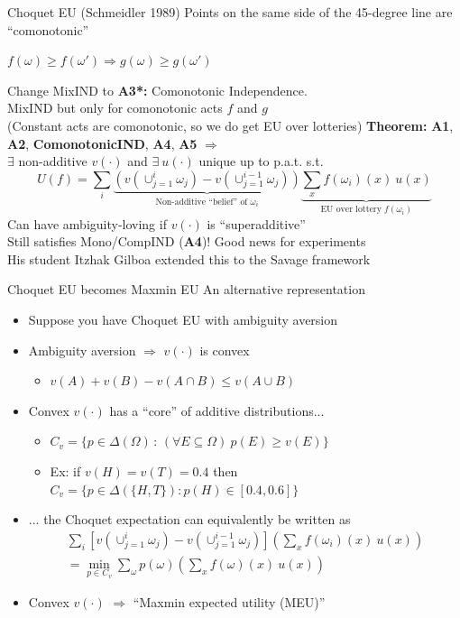 \begin{frame}{Choquet EU (Schmeidler 1989)}
    Points on the same side of the 45-degree line are ``comonotonic''
    \begin{center}
        $f(\omega)\geq f(\omega') \Rightarrow g(\omega)\geq g(\omega')$
    \end{center}
    Change MixIND to \textbf{A3*:} Comonotonic Independence.\\
    MixIND but only for comonotonic acts $f$ and $g$\\
    (Constant acts are comonotonic, so we do get EU over lotteries)
    \br
    \textbf{Theorem:} \textbf{A1}, \textbf{A2}, \textbf{ComonotonicIND}, \textbf{A4}, \textbf{A5} $\Rightarrow$\\
    $\exists$ non-additive $v(\cdot)$ and $\exists\ u(\cdot)$ unique up to p.a.t. s.t.
    $$
        U(f) = \sum_i \underbrace{\left( v(\cup_{j=1}^i \omega_j) - v(\cup_{j=1}^{i-1} \omega_j) \right)}_{\text{Non-additive ``belief'' of }\omega_i} \underbrace{\sum_x f(\omega_i)(x)\ u(x)}_{\text{EU over lottery }f(\omega_i)} 
    $$
    Can have ambiguity-loving if $v(\cdot)$ is ``superadditive''\\
    Still satisfies Mono/CompIND (\textbf{A4})! Good news for experiments\\
    His student Itzhak Gilboa extended this to the Savage framework
\end{frame}

\begin{frame}{Choquet EU becomes Maxmin EU}
An alternative representation
\begin{itemize}
    \item Suppose you have Choquet EU with ambiguity aversion
    \item Ambiguity aversion $\Rightarrow$ $v(\cdot)$ is convex
    \begin{itemize}
        \item $v(A)+v(B) - v(A\cap B) \leq v(A\cup B)$
    \end{itemize}
    \item Convex $v(\cdot)$ has a ``core'' of additive distributions...
    \begin{itemize}
        \item $C_v = \{p\in \Delta(\Omega)\, :\, (\forall E\subseteq \Omega)\ p(E)\geq v(E)\}$
        \item Ex: if $v(H)=v(T)=0.4$ then $C_v=\{p\in \Delta(\{H,T\}): p(H)\in [0.4,0.6]\}$
    \end{itemize}
    \item ... the Choquet expectation can equivalently be written as
    \begin{align*}
        \sum_i \left[v(\cup_{j=1}^i \omega_j) - v(\cup_{j=1}^{i-1} \omega_j) \right] \left(\sum_x f(\omega_i)(x)\ u(x)\right)\\
        = \min_{p\in C_v} \sum_\omega p(\omega) \left( \sum_x f(\omega)(x)\ u(x) \right)
    \end{align*}
    \item Convex $v(\cdot)$ $\Rightarrow$ ``Maxmin expected utility (MEU)''
\end{itemize}
\end{frame}

